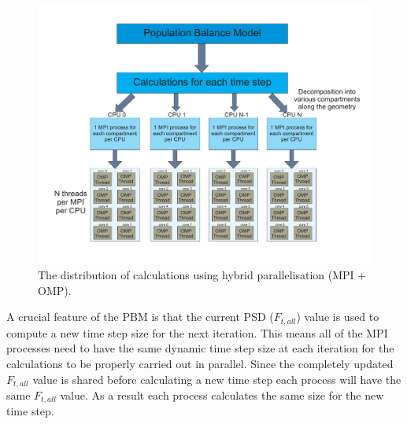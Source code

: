 \documentclass[preprint,11pt,authoryear]{elsarticle}
\begin{document}
\begin{figure}[H]
\centering
\includegraphics[scale=0.5]{PBM_decomposition.pdf}
\caption{The distribution of calculations using hybrid parallelisation (MPI + OMP).}
\label{fig:mthds_PBM_decompostion}
\end{figure}

\par A crucial feature of the PBM is that the current PSD ($F_{t,all}$) value is used to compute a new 
time step size for the next iteration. This means all of the MPI processes need to have the same 
dynamic time step size at each iteration for the calculations to be properly carried out in parallel. Since 
the completely updated $F_{t,all}$ value is shared before calculating a new time step each process will 
have the same $F_{t,all}$ value. As a result each process calculates the same size for the new time 
step. 
\end{document}
